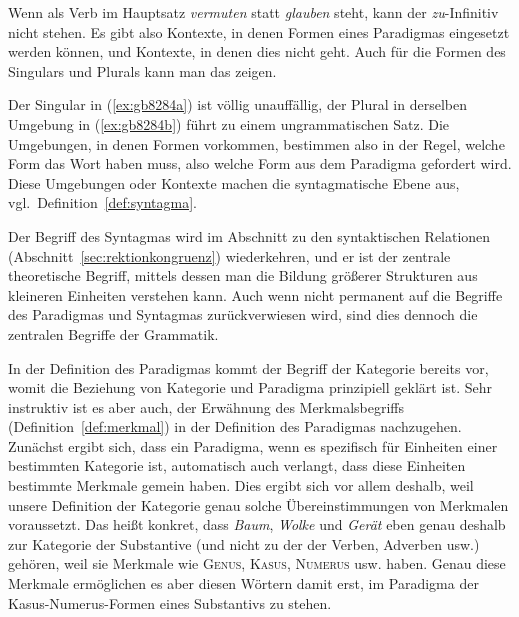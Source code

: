 Wenn als Verb im Hauptsatz \textit{vermuten} statt \textit{glauben} steht, kann der \textit{zu}-Infinitiv nicht stehen.
Es gibt also Kontexte, in denen Formen eines Paradigmas eingesetzt werden können, und Kontexte, in denen dies nicht geht.
Auch für die Formen des Singulars und Plurals kann man das zeigen.

\begin{exe}
  \ex\label{ex:gb8284}
  \begin{xlist}
  \end{xlist}
\end{exe}

Der Singular in (\ref{ex:gb8284a}) ist völlig unauffällig, der Plural in derselben Umgebung in (\ref{ex:gb8284b}) führt zu einem ungrammatischen Satz.
Die Umgebungen, in denen Formen vorkommen, bestimmen also in der Regel, welche Form das Wort haben muss, also welche Form aus dem Paradigma gefordert wird.
Diese Umgebungen oder Kontexte machen die syntagmatische Ebene aus, vgl.\ Definition~\ref{def:syntagma}.



Der Begriff des Syntagmas wird im Abschnitt zu den syntaktischen Relationen (Abschnitt~\ref{sec:rektionkongruenz}) wiederkehren, und er ist der zentrale theoretische Begriff, mittels dessen man die Bildung größerer Strukturen aus kleineren Einheiten verstehen kann.
Auch wenn nicht permanent auf die Begriffe des Paradigmas und Syntagmas zurückverwiesen wird, sind dies dennoch die zentralen Begriffe der Grammatik.


In der Definition des Paradigmas kommt der Begriff der Kategorie bereits vor, womit die Beziehung von Kategorie und Paradigma prinzipiell geklärt ist.
Sehr instruktiv ist es aber auch, der Erwähnung des Merkmalsbegriffs (Definition~\ref{def:merkmal}) in der Definition des Paradigmas nachzugehen.
Zunächst ergibt sich, dass ein Paradigma, wenn es spezifisch für Einheiten einer bestimmten Kategorie ist, automatisch auch verlangt, dass diese Einheiten bestimmte Merkmale gemein haben.
Dies ergibt sich vor allem deshalb, weil unsere Definition der Kategorie genau solche Übereinstimmungen von Merkmalen voraussetzt.
Das heißt konkret, dass \zB \textit{Baum}, \textit{Wolke} und \textit{Gerät} eben genau deshalb zur Kategorie der Substantive (und nicht zu der der Verben, Adverben usw.) gehören, weil sie Merkmale wie \textsc{Genus}, \textsc{Kasus}, \textsc{Numerus} usw. haben.
Genau diese Merkmale ermöglichen es aber diesen Wörtern damit erst, im Paradigma der Kasus-Numerus-Formen eines Substantivs zu stehen.

